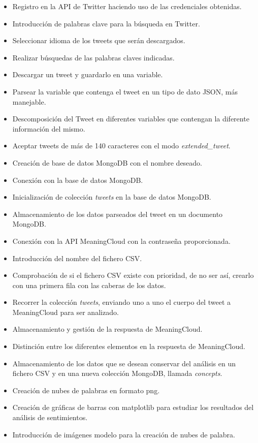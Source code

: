 \begin{itemize}
	\item Registro en la API de Twitter haciendo uso de las credenciales obtenidas.
	\item Introducción de palabras clave para la búsqueda en Twitter.
	\item Seleccionar idioma de los tweets que serán descargados.
	\item Realizar búsquedas de las palabras claves indicadas.
	\item Descargar un tweet y guardarlo en una variable.
	\item Parsear la variable que contenga el tweet en un tipo de dato JSON, más manejable.
	\item Descomposición del Tweet en diferentes variables que contengan la diferente información del mismo.
	\item Aceptar tweets de más de 140 caracteres con el modo \textit{extended\_tweet}.
	\item Creación de base de datos MongoDB con el nombre deseado.
	\item Conexión con la base de datos MongoDB.
	\item Inicialización de colección \textit{tweets} en la base de datos MongoDB.
	\item Almacenamiento de los datos parseados del tweet en un documento MongoDB. 
	
	\item Conexión con la API MeaningCloud con la contraseña proporcionada. 
	\item Introducción del nombre del fichero CSV. 
	\item Comprobación de si el fichero CSV existe con prioridad, de no ser así, crearlo con una primera fila con las caberas de los datos. 
	\item Recorrer la colección \textit{tweets}, enviando uno a uno el cuerpo del tweet a MeaningCloud para ser analizado. 
	\item Almacenamiento y gestión de la respuesta de MeaningCloud.
	\item Distinción entre los diferentes elementos en la respuesta de MeaningCloud. 
	\item Almacenamiento de los datos que se desean conservar del análisis en un fichero CSV y en una nueva colección MongoDB, llamada \textit{concepts}.
	
	\item Creación de nubes de palabras en formato png. 
	\item Creación de gráficas de barras con matplotlib para estudiar los resultados del análisis de sentimientos. 
	\item Introducción de imágenes modelo para la creación de nubes de palabra.
	
	
	
	


\end{itemize}


